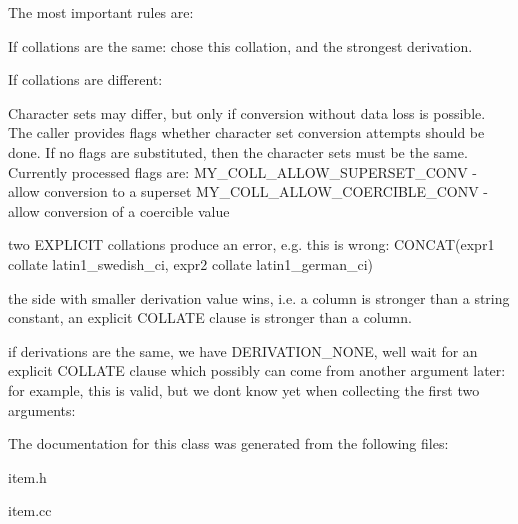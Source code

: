 The most important rules are\+:
\begin{DoxyEnumerate}
\item If collations are the same\+: chose this collation, and the strongest derivation.
\item If collations are different\+:
\end{DoxyEnumerate}
\begin{DoxyItemize}
\item Character sets may differ, but only if conversion without data loss is possible. The caller provides flags whether character set conversion attempts should be done. If no flags are substituted, then the character sets must be the same. Currently processed flags are\+: M\+Y\+\_\+\+C\+O\+L\+L\+\_\+\+A\+L\+L\+O\+W\+\_\+\+S\+U\+P\+E\+R\+S\+E\+T\+\_\+\+C\+O\+NV -\/ allow conversion to a superset M\+Y\+\_\+\+C\+O\+L\+L\+\_\+\+A\+L\+L\+O\+W\+\_\+\+C\+O\+E\+R\+C\+I\+B\+L\+E\+\_\+\+C\+O\+NV -\/ allow conversion of a coercible value
\item two E\+X\+P\+L\+I\+C\+IT collations produce an error, e.\+g. this is wrong\+: C\+O\+N\+C\+A\+T(expr1 collate latin1\+\_\+swedish\+\_\+ci, expr2 collate latin1\+\_\+german\+\_\+ci)
\item the side with smaller derivation value wins, i.\+e. a column is stronger than a string constant, an explicit C\+O\+L\+L\+A\+TE clause is stronger than a column.
\item if derivations are the same, we have D\+E\+R\+I\+V\+A\+T\+I\+O\+N\+\_\+\+N\+O\+NE, we\textquotesingle{}ll wait for an explicit C\+O\+L\+L\+A\+TE clause which possibly can come from another argument later\+: for example, this is valid, but we don\textquotesingle{}t know yet when collecting the first two arguments\+: 
\begin{DoxyCode}{0}
\end{DoxyCode}
 
\end{DoxyItemize}

The documentation for this class was generated from the following files\+:\begin{DoxyCompactItemize}
\item 
item.\+h\item 
item.\+cc\end{DoxyCompactItemize}
